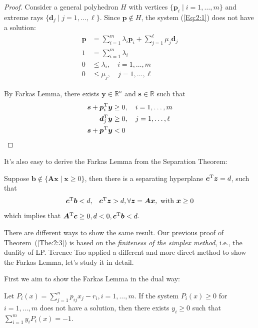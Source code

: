\begin{proof}
Consider a general polyhedron $H$ with vertices $\{\bm p_i\mid i=1,\dots,m\}$ and extreme rays $\{\bm d_j\mid j=1,\dots,\ell\}$. Since $\bm p\notin H$, the system (\ref{Eq:2:1}) does not have a solution:
\begin{equation}\label{Eq:2:1}
\begin{aligned}
\bm p&=\sum_{i=1}^m\lambda_i\bm p_i+\sum_{j=1}^\ell\mu_j\bm d_j\\
1&=\sum_{i=1}^m\lambda_i\\
0&\le\lambda_i,\quad i=1,\dots,m\\
0&\le\mu_j,\quad j=1,\dots,\ell
\end{aligned}
\end{equation}

By Farkas Lemma, there exists $\bm y\in\mathbb{R}^n$ and $\bm s\in\mathbb{R}$ such that
\begin{align*}
\bm s+\bm p_i^{\mathrm T}\bm y&\ge0,\quad i=1,\dots,m\\
\bm d_j^{\mathrm T}\bm y&\ge0,\quad j=1,\dots,\ell\\
\bm s+\bm p^{\mathrm T}\bm y&<0
\end{align*}

\end{proof}

\begin{remark}
It's also easy to derive the Farkas Lemma from the Separation Theorem:

Suppose $\bm b\notin \{\bm A\bm x\mid\bm x\ge0\}$, then there is a separating hyperplane $\bm c^{\mathrm T}\bm z= d$, such that
\[
\begin{array}{ll}
\bm c^{\mathrm T}\bm b< d,
&
\bm c^{\mathrm T}\bm z> d,\forall \bm z=\bm A\bm x,\text{ with }\bm x\ge0
\end{array}
\]
which implies that $\bm A^{\mathrm T}\bm c\ge0,d<0,\bm c^{\mathrm T}\bm b<d$.
\end{remark}

There are different ways to show the same result. Our previous proof of Theorem~(\ref{The:2:3}) is based on the \emph{finiteness of the simplex method}, i.e., the duality of LP. Terence Tao applied a different and more direct method to show the Farkas Lemma, let's study it in detail.

First we aim to show the Farkas Lemma in the dual way:
\begin{theorem}
Let $P_i(x)=\sum_{j=1}^np_{ij}x_j - r_i, i=1,\dots,m$.
If the system $P_i(x)\ge0$ for $i=1,\dots,m$ does not have a solution, 
then there exists $y_i\ge0$ such that
$
\sum_{i=1}^my_iP_i(x)=-1.
$
\end{theorem}

